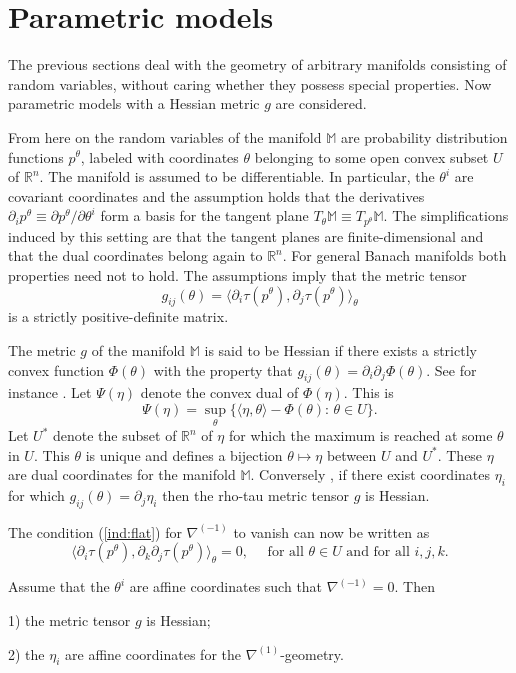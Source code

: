 \documentclass[graybox]{svmult}
\newcommand{\be}{\begin{equation}}
\newcommand{\ee}{\end{equation}}
\newcommand{\Mo}{\mathbb M}
\newcommand{\Ro}{\mathbb R}
\begin{document}
\section{Parametric models}
\label{sect:param}

The previous sections deal with the geometry of arbitrary manifolds consisting of random variables,
without caring whether they possess special properties. Now parametric models 
with a Hessian metric $g$ are considered. 

From here on the random variables of the manifold $\Mo$ are probability distribution functions $p^\theta$,
labeled with coordinates $\theta$ belonging to some open convex subset $U$ of $\Ro^n$.
The manifold is assumed to be differentiable. In particular, the $\theta^i$ are covariant coordinates
and the assumption holds that the derivatives $\partial_ip^\theta\equiv\partial p^\theta/\partial\theta^i$
form a basis for the tangent plane $T_\theta\Mo\equiv T_{p^\theta}\Mo$.
The simplifications induced by this setting are that the tangent planes are finite-dimensional
and that the dual coordinates belong again to $\Ro^n$. For general Banach manifolds
both properties need not to hold.
The assumptions imply that the
metric tensor 
\be
g_{ij}(\theta)=\langle \partial_i\tau(p^\theta),\partial_j\tau(p^\theta)\rangle_\theta
\nonumber
\ee
is a strictly positive-definite matrix.

The metric $g$ of the manifold $\Mo$ is said to be Hessian if there exists a strictly convex function
$\Phi(\theta)$ with the property that
$g_{ij}(\theta)=\partial_i\partial_j\Phi(\theta)$. 
See for instance \cite {shima2007}.
Let $\Psi(\eta)$ denote the convex dual of $\Phi(\eta)$. This is
\be
\Psi(\eta)=\sup_{\theta}\{\langle\eta,\theta\rangle-\Phi(\theta):\,\theta\in U\}.
\nonumber
\ee
Let $U^*$ denote the subset of $\Ro^n$ of $\eta$ for which the maximum is reached
at some $\theta$ in $U$. This $\theta$ is unique and defines a bijection
$\theta\mapsto\eta$ between $U$ and $U^*$. These $\eta$ are dual coordinates for the manifold $\Mo$.
Conversely \cite{NZ17}, if there exist
coordinates $\eta_i$ for which $g_{ij}(\theta)=\partial_j\eta_i$ then 
the rho-tau metric tensor $g$ is Hessian.


The condition (\ref {ind:flat}) for $\nabla^{(-1)}$ to vanish can now be written as
\be
\langle\partial_i\tau(p^\theta),\partial_k\partial_j\tau(p^\theta)\rangle_\theta=0,
\quad\mbox{ for all }\theta\in U\mbox{ and for all }i,j,k.
\label{ind:flat2}
\ee

\begin{theorem}
Assume that the $\theta^i$ are affine coordinates such that $\nabla^{(-1)}=0$. 
Then 
\begin{description}
 \item 1) the metric tensor $g$ is Hessian;
 \item 2) the $\eta_i$ are affine coordinates for the $\nabla^{(1)}$-geometry.
\end{description}
 
\end{theorem}
\end{document}

